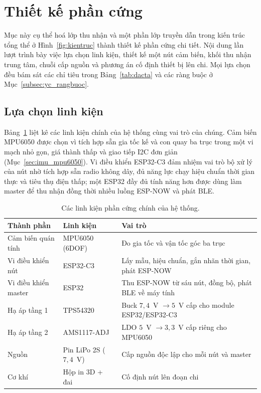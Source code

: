 \documentclass[../DoAn.tex]{subfiles}
\begin{document}
\section{Thiết kế phần cứng}
\label{sec:phancung}

Mục này cụ thể hoá lớp thu nhận và một phần lớp truyền dẫn trong kiến trúc tổng
thể ở Hình~\ref{fig:kientruc} thành thiết kế phần cứng chi tiết. Nội dung lần lượt
trình bày việc lựa chọn linh kiện, thiết kế một nút cảm biến, khối thu nhận trung
tâm, chuỗi cấp nguồn và phương án cố định thiết bị lên chi. Mọi lựa chọn đều bám
sát các chỉ tiêu trong Bảng~\ref{tab:dacta} và các ràng buộc ở
Mục~\ref{subsec:yc_rangbuoc}.

\subsection{Lựa chọn linh kiện}
\label{subsec:hw_linhkien}
Bảng~\ref{tab:linhkien} liệt kê các linh kiện chính của hệ thống cùng vai trò của
chúng. Cảm biến MPU6050 được chọn vì tích hợp sẵn gia tốc kế và con quay ba trục
trong một vi mạch nhỏ gọn, giá thành thấp và giao tiếp I2C đơn giản
(Mục~\ref{sec:imu_mpu6050}). Vi điều khiển ESP32-C3 đảm nhiệm vai trò bộ xử lý của
nút nhờ tích hợp sẵn radio không dây, đủ năng lực chạy hiệu chuẩn thời gian thực
và tiêu thụ điện thấp; một ESP32 đầy đủ tính năng hơn được dùng làm master để thu
nhận đồng thời nhiều luồng ESP-NOW và phát BLE.

\begin{table}[h]
    \centering
    \caption{Các linh kiện phần cứng chính của hệ thống.}
    \label{tab:linhkien}
    \begin{tabular}{p{3.5cm} p{4.0cm} p{5.6cm}}
        \hline
        \textbf{Thành phần}  & \textbf{Linh kiện}      & \textbf{Vai trò}                                       \\
        \hline
        Cảm biến quán tính   & MPU6050 (6DOF)          & Đo gia tốc và vận tốc góc ba trục                      \\
        Vi điều khiển nút    & ESP32-C3                & Lấy mẫu, hiệu chuẩn, gắn nhãn thời gian, phát ESP-NOW  \\
        Vi điều khiển master & ESP32                   & Thu ESP-NOW từ sáu nút, đồng bộ, phát BLE về máy tính  \\
        Hạ áp tầng 1         & TPS54320                & Buck $7{,}4$~V $\to 5$~V cấp cho module ESP32/ESP32-C3 \\
        Hạ áp tầng 2         & AMS1117-ADJ             & LDO $5$~V $\to 3{,}3$~V cấp riêng cho MPU6050          \\
        Nguồn                & Pin LiPo 2S ($7{,}4$~V) & Cấp nguồn độc lập cho mỗi nút và master                \\
        Cơ khí               & Hộp in 3D + đai         & Cố định nút lên đoạn chi                               \\
        \hline
    \end{tabular}
\end{table}
\end{document}
